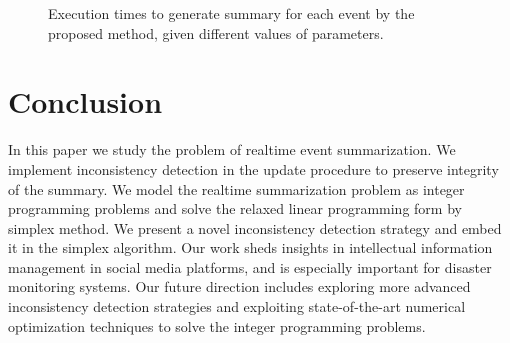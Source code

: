 \documentclass[envcountsame]{llncs}
\begin{document}
\vspace{-0.5cm}
\begin{figure}
  \centering
{}
\hspace{-4ex}
\setlength{\abovecaptionskip}{-0.1cm}
\caption{Execution times to generate summary for each event by the proposed method, given different values of parameters.}
\end{figure}
\vspace{-0.5cm}

\section{Conclusion}\label{sec:conclusion}
 In this paper we study the problem of realtime event summarization. We implement inconsistency detection in the update procedure to preserve integrity of the summary. We model the realtime summarization problem as integer programming problems and solve the relaxed linear programming form by simplex method. We present a novel inconsistency detection strategy and embed it in the simplex algorithm. Our work sheds insights in intellectual information management in social media platforms, and is especially important for disaster monitoring systems. Our future direction includes exploring more advanced inconsistency detection strategies and exploiting state-of-the-art numerical optimization techniques to solve the integer programming problems.
\end{document}
